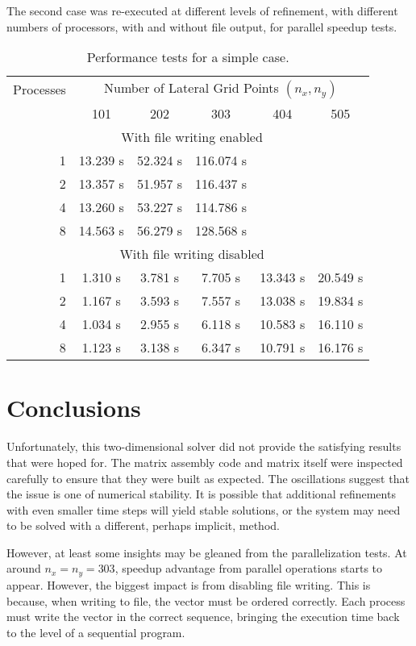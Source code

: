 \documentclass{article}
\begin{document}
The second case was re-executed at different levels of refinement, with different numbers of processors, with and without file output, for parallel speedup tests.

\begin{table}[h!]
	\centering
	\caption{Performance tests for a simple case.}
	\label{tbl:perftests}
	\begin{tabular}{r|ccccc}
		Processes & \multicolumn{5}{c}{Number of Lateral Grid Points $(n_{x}, n_{y})$} \\
		 & 101 & 202 & 303 & 404 & 505 \\
		\hline
		 & \multicolumn{4}{c}{With file writing enabled} \\
		\hline
		1 & 13.239 s & 52.324 s & 116.074 s &  &  \\
		2 & 13.357 s & 51.957 s & 116.437 s &  &  \\
		4 & 13.260 s & 53.227 s & 114.786 s &  &  \\
		8 & 14.563 s & 56.279 s & 128.568 s &  &  \\
		\hline
		 & \multicolumn{4}{c}{With file writing disabled} \\
		\hline
		1 & 1.310 s & 3.781 s & 7.705 s & 13.343 s & 20.549 s \\
		2 & 1.167 s & 3.593 s & 7.557 s & 13.038 s & 19.834 s \\
		4 & 1.034 s & 2.955 s & 6.118 s & 10.583 s & 16.110 s \\
		8 & 1.123 s & 3.138 s & 6.347 s & 10.791 s & 16.176 s
	\end{tabular}
\end{table}

\section{Conclusions}

Unfortunately, this two-dimensional solver did not provide the satisfying results that were hoped for. The matrix assembly code and matrix itself were inspected carefully to ensure that they were built as expected. The oscillations suggest that the issue is one of numerical stability. It is possible that additional refinements with even smaller time steps will yield stable solutions, or the system may need to be solved with a different, perhaps implicit, method.

However, at least some insights may be gleaned from the parallelization tests. At around $n_{x} = n_{y} = 303$, speedup advantage from parallel operations starts to appear. However, the biggest impact is from disabling file writing. This is because, when writing to file, the vector must be ordered correctly. Each process must write the vector in the correct sequence, bringing the execution time back to the level of a sequential program.
\end{document}
